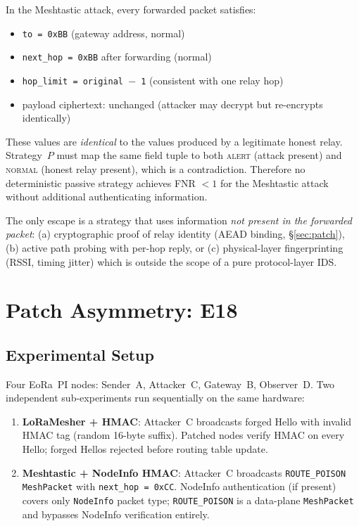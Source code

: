 \documentclass[journal]{IEEEtran}
\begin{document}
In the Meshtastic attack, every forwarded packet satisfies:
\begin{itemize}
  \item \texttt{to = 0xBB} (gateway address, normal)
  \item \texttt{next\_hop = 0xBB} after forwarding (normal)
  \item \texttt{hop\_limit = original $-$ 1} (consistent with one relay hop)
  \item payload ciphertext: unchanged (attacker may decrypt but re-encrypts identically)
\end{itemize}

These values are \emph{identical} to the values produced by a legitimate
honest relay. Strategy~$P$ must map the same field tuple to both
\textsc{alert} (attack present) and \textsc{normal} (honest relay present),
which is a contradiction. Therefore no deterministic passive strategy
achieves FNR $< 1$ for the Meshtastic attack without additional
authenticating information.

The only escape is a strategy that uses information \emph{not present in
the forwarded packet}: (a) cryptographic proof of relay identity
(AEAD binding, \S\ref{sec:patch}), (b) active path probing with
per-hop reply, or (c) physical-layer fingerprinting (RSSI, timing
jitter) which is outside the scope of a pure protocol-layer IDS.

\section{Patch Asymmetry: E18}
\label{sec:e18}

\subsection{Experimental Setup}

Four EoRa~PI nodes: Sender~A, Attacker~C, Gateway~B, Observer~D.
Two independent sub-experiments run sequentially on the same hardware:

\begin{enumerate}
  \item \textbf{LoRaMesher + HMAC}: Attacker~C broadcasts forged Hello with
    invalid HMAC tag (random 16-byte suffix). Patched nodes verify HMAC on
    every Hello; forged Hellos rejected before routing table update.
  \item \textbf{Meshtastic + NodeInfo HMAC}: Attacker~C broadcasts
    \texttt{ROUTE\_POISON MeshPacket} with \texttt{next\_hop = 0xCC}.
    NodeInfo authentication (if present) covers only \texttt{NodeInfo}
    packet type; \texttt{ROUTE\_POISON} is a data-plane \texttt{MeshPacket}
    and bypasses NodeInfo verification entirely.
\end{enumerate}
\end{document}
